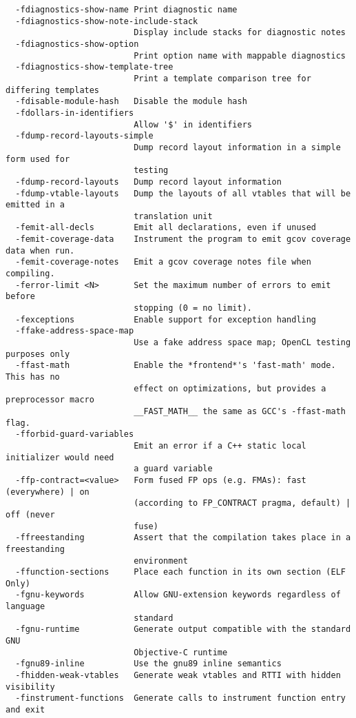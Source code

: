 \begin{verbatim}
  -fdiagnostics-show-name Print diagnostic name
  -fdiagnostics-show-note-include-stack
                          Display include stacks for diagnostic notes
  -fdiagnostics-show-option
                          Print option name with mappable diagnostics
  -fdiagnostics-show-template-tree
                          Print a template comparison tree for differing templates
  -fdisable-module-hash   Disable the module hash
  -fdollars-in-identifiers
                          Allow '$' in identifiers
  -fdump-record-layouts-simple
                          Dump record layout information in a simple form used for 
                          testing
  -fdump-record-layouts   Dump record layout information
  -fdump-vtable-layouts   Dump the layouts of all vtables that will be emitted in a 
                          translation unit
  -femit-all-decls        Emit all declarations, even if unused
  -femit-coverage-data    Instrument the program to emit gcov coverage data when run.
  -femit-coverage-notes   Emit a gcov coverage notes file when compiling.
  -ferror-limit <N>       Set the maximum number of errors to emit before 
                          stopping (0 = no limit).
  -fexceptions            Enable support for exception handling
  -ffake-address-space-map
                          Use a fake address space map; OpenCL testing purposes only
  -ffast-math             Enable the *frontend*'s 'fast-math' mode. This has no 
                          effect on optimizations, but provides a preprocessor macro 
                          __FAST_MATH__ the same as GCC's -ffast-math flag.
  -fforbid-guard-variables
                          Emit an error if a C++ static local initializer would need 
                          a guard variable
  -ffp-contract=<value>   Form fused FP ops (e.g. FMAs): fast (everywhere) | on 
                          (according to FP_CONTRACT pragma, default) | off (never 
                          fuse)
  -ffreestanding          Assert that the compilation takes place in a freestanding 
                          environment
  -ffunction-sections     Place each function in its own section (ELF Only)
  -fgnu-keywords          Allow GNU-extension keywords regardless of language 
                          standard
  -fgnu-runtime           Generate output compatible with the standard GNU 
                          Objective-C runtime
  -fgnu89-inline          Use the gnu89 inline semantics
  -fhidden-weak-vtables   Generate weak vtables and RTTI with hidden visibility
  -finstrument-functions  Generate calls to instrument function entry and exit

\end{verbatim}
